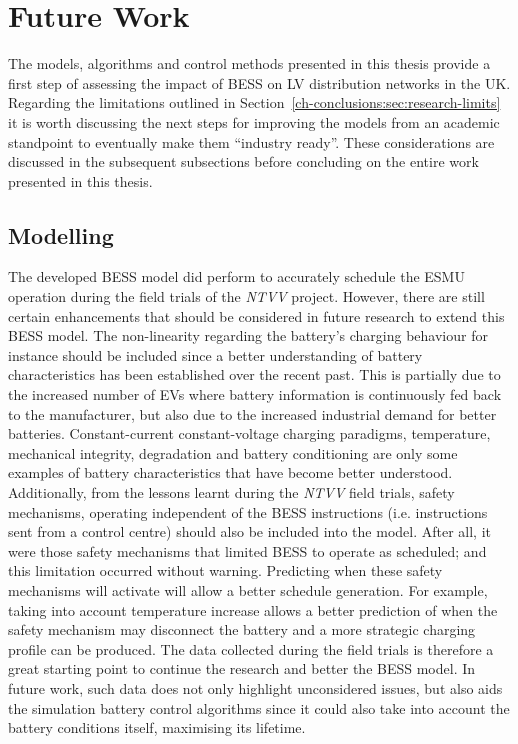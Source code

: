 \section{Future Work}
\label{ch-conclusions:sec:future-work}

The models, algorithms and control methods presented in this thesis provide a first step of assessing the impact of BESS on LV distribution networks in the UK.
Regarding the limitations outlined in Section~\ref{ch-conclusions:sec:research-limits} it is worth discussing the next steps for improving the models from an academic standpoint to eventually make them ``industry ready''.
These considerations are discussed in the subsequent subsections before concluding on the entire work presented in this thesis.

\subsection{Modelling}

The developed BESS model did perform to accurately schedule the ESMU operation during the field trials of the \textit{NTVV} project.
However, there are still certain enhancements that should be considered in future research to extend this BESS model.
The non-linearity regarding the battery's charging behaviour for instance should be included since a better understanding of battery characteristics has been established over the recent past.
This is partially due to the increased number of EVs where battery information is continuously fed back to the manufacturer, but also due to the increased industrial demand for better batteries.
Constant-current constant-voltage charging paradigms, temperature, mechanical integrity, degradation and battery conditioning are only some examples of battery characteristics that have become better understood.
Additionally, from the lessons learnt during the \textit{NTVV} field trials, safety mechanisms, operating independent of the BESS instructions (i.e. instructions sent from a control centre) should also be included into the model.
After all, it were those safety mechanisms that limited BESS to operate as scheduled; and this limitation occurred without warning.
Predicting when these safety mechanisms will activate will allow a better schedule generation.
For example, taking into account temperature increase allows a better prediction of when the safety mechanism may disconnect the battery and a more strategic charging profile can be produced.
The data collected during the field trials is therefore a great starting point to continue the research and better the BESS model.
In future work, such data does not only highlight unconsidered issues, but also aids the simulation battery control algorithms since it could also take into account the battery conditions itself, maximising its lifetime.

